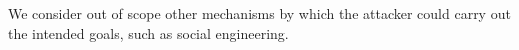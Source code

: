 


We consider out of scope other mechanisms by which the attacker could carry out the intended goals, such as social engineering.
